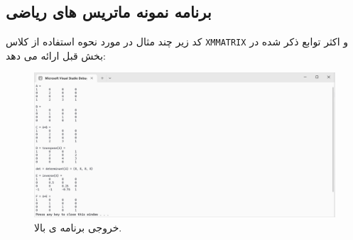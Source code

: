 \subsection{\textbf{برنامه نمونه ماتریس های ریاضی }}
{
    \Large
    \begin{spacing}{1.5}
        کد زیر چند مثال در مورد نحوه استفاده از کلاس \texttt{XMMATRIX} و اکثر توابع ذکر شده در بخش قبل ارائه می دهد:
        \textbf{\vspace{6pt}}
        \lr{}
        \textbf{\vspace{6pt}}

        \begin{figure}[H]
            \centering
            \setlength{\belowcaptionskip}{-10pt}
            \includegraphics[width=\textwidth]{Images/4/2/4.Session.1.2.1}
            \caption {خروجی برنامه ی بالا.}
            \label{fig:4.Session.1.2.1}
        \end{figure}
    \end{spacing}
}
\newpage


